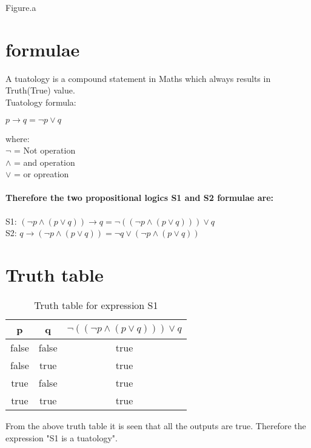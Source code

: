 \documentclass[journal,12pt,twocolumn]{IEEEtran}
\begin{document}
\begin{center}
Figure.a
\end{center}

\section{formulae}
  A tuatology is a compound statement in Maths which always results in Truth(True) value.\\
  Tuatology formula:
\begin{center}
  $p \longrightarrow q = \neg{p} \lor{q}$
\end{center}
where:\\
$\neg{}$ = Not operation\\
$\land{}$ = and operation\\
$\lor{}$ = or opreation\\

   \paragraph{Therefore the two propositional logics S1 and S2 formulae are:}
S1: $(\neg{p} \land({p}\lor{q})) \longrightarrow q = \neg((\neg{p} \land({p}\lor{q})))\lor{q}$\\
S2: $q \longrightarrow (\neg{p}\land({p}\lor{q})) = \neg{q} \lor (\neg{p} \land ({p}\lor {q}))$

\section{Truth table}


 \begin{table}[h]
  \centering
  \caption{Truth table for expression S1}
   \begin{tabular}{|c|c|c|}
\hline
p & q & $\neg((\neg{p} \land({p}\lor{q})))\lor{q}$\\
\hline
false & false & true\\
\hline
false & true & true\\
\hline
true & false & true\\
\hline
true & true & true\\
\hline
   \end{tabular}
\end{table}
	 From the above truth table it is seen that all the outputs are true. Therefore the expression "S1 is a tuatology".\\
\end{document}
